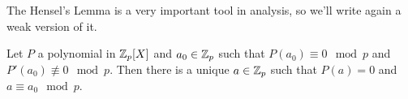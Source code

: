 	 	The Hensel's Lemma is a very important tool in \padic analysis, so we'll write again a weak version of it.
	 	\begin{corollary}
	 		Let $P$ a polynomial in $\mathbb{Z}_p[X]$ and $a_0 \in \mathbb{Z}_p$ such that $P(a_0) \equiv 0 \mod p$ and $P'(a_0) \not\equiv 0 \mod p$. Then there is a unique $a \in \mathbb{Z}_p$ such that $P(a) = 0$ and $a \equiv a_0 \mod p$.
	 	\end{corollary}